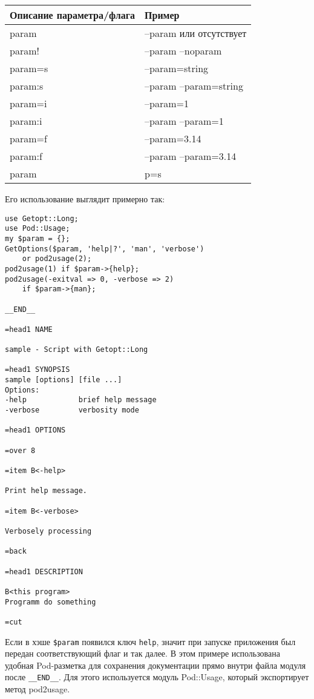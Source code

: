 \begin{table}[H]{ \renewcommand{\arraystretch}{1.4} \centering
  \begin{tabular}{|p{7cm}|p{5cm}|}\hline
 {\bf Описание параметра/флага}   & {\bf Пример}             \\ \hline
    param                         & --param или отсутствует  \\ \hline
    param!                        & --param --noparam        \\ \hline
    param=s                       & --param=string           \\ \hline
    param:s                       & --param --param=string   \\ \hline
    param=i                       & --param=1                \\ \hline
    param:i                       & --param --param=1        \\ \hline
    param=f                       & --param=3.14             \\ \hline
    param:f                       & --param --param=3.14     \\ \hline
    param                         &  p=s                     \\ \hline
\end{tabular} }
\end{table}
Его использование выглядит примерно так:
\begin{verbatim}
use Getopt::Long;
use Pod::Usage;
my $param = {};
GetOptions($param, 'help|?', 'man', 'verbose')
	or pod2usage(2);
pod2usage(1) if $param->{help};
pod2usage(-exitval => 0, -verbose => 2)
	if $param->{man};

__END__

=head1 NAME

sample - Script with Getopt::Long

=head1 SYNOPSIS
sample [options] [file ...]
Options:
-help            brief help message
-verbose         verbosity mode

=head1 OPTIONS

=over 8

=item B<-help>

Print help message.

=item B<-verbose>

Verbosely processing

=back

=head1 DESCRIPTION

B<this program>
Programm do something

=cut
\end{verbatim}
Если в хэше \verb|$param| появился ключ \verb|help|, значит при запуске приложения был передан соответствующий флаг и так далее. В этом примере использована удобная Pod-разметка для сохранения документации прямо внутри файла модуля после \verb|__END__|. Для этого используется модуль Pod::Usage, который экспортирует метод pod2usage.

